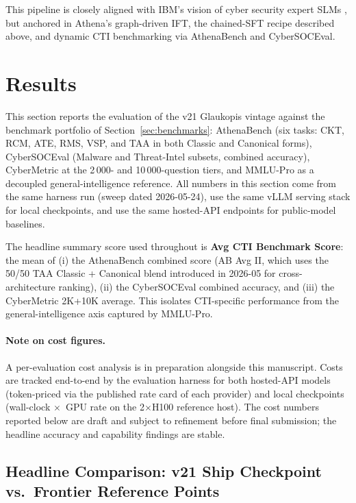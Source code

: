 \documentclass[unnumsec,webpdf,contemporary,large]{oup-authoring-template}
\theoremstyle{thmstyleone}
\theoremstyle{thmstyletwo}
\theoremstyle{thmstylethree}
\begin{document}
This pipeline is closely aligned with IBM's vision of cyber security expert SLMs \cite{levi2024cyberpal,levi2025toward}, but anchored in Athena's graph-driven IFT, the chained-SFT recipe described above, and dynamic CTI benchmarking via AthenaBench and CyberSOCEval.


\section{Results}
\label{sec:results}

This section reports the evaluation of the v21 Glaukopis vintage against the benchmark portfolio of Section~\ref{sec:benchmarks}: AthenaBench (six tasks: CKT, RCM, ATE, RMS, VSP, and TAA in both Classic and Canonical forms), CyberSOCEval (Malware and Threat-Intel subsets, combined accuracy), CyberMetric at the 2\,000- and 10\,000-question tiers, and MMLU-Pro as a decoupled general-intelligence reference. All numbers in this section come from the same harness run (sweep dated 2026-05-24), use the same vLLM serving stack for local checkpoints, and use the same hosted-API endpoints for public-model baselines.

The headline summary score used throughout is \textbf{Avg CTI Benchmark Score}: the mean of (i) the AthenaBench combined score (AB Avg II, which uses the 50/50 TAA Classic + Canonical blend introduced in 2026-05 for cross-architecture ranking), (ii) the CyberSOCEval combined accuracy, and (iii) the CyberMetric 2K+10K average. This isolates CTI-specific performance from the general-intelligence axis captured by MMLU-Pro.

\paragraph{Note on cost figures.}
A per-evaluation cost analysis is in preparation alongside this manuscript. Costs are tracked end-to-end by the evaluation harness for both hosted-API models (token-priced via the published rate card of each provider) and local checkpoints (wall-clock $\times$~GPU rate on the 2$\times$H100 reference host). The cost numbers reported below are draft and subject to refinement before final submission; the headline accuracy and capability findings are stable.

\subsection{Headline Comparison: v21 Ship Checkpoint vs.\ Frontier Reference Points}
\label{sec:results-headline}
\end{document}
